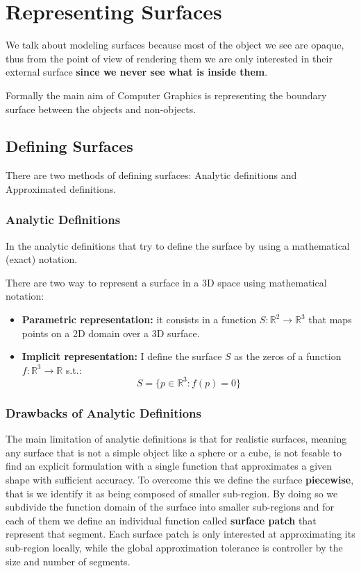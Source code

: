 \chapter{Representing Surfaces}
We talk about modeling surfaces because most of the object we see are opaque, thus from the point of view of rendering them we are only interested in their external surface \textbf{since we never see what is inside them}.\par
Formally the main aim of Computer Graphics is representing the boundary surface between the objects and non-objects.

\section{Defining Surfaces}
There are two methods of defining surfaces: Analytic definitions and Approximated definitions.

\subsection{Analytic Definitions}
In the analytic definitions that try to define the surface by using a mathematical (exact) notation.\par
There are two way to represent a surface in a 3D space using mathematical notation:
\begin{itemize}
    \item \textbf{Parametric representation:} it consists in a function $S : \mathbb{R}^{2} \rightarrow \mathbb{R}^{3}$ that maps points on a 2D domain over a 3D surface.  
    \item \textbf{Implicit representation:} I define the surface $S$ as the zeros of a function $f: \mathbb{R}^{3} \rightarrow \mathbb{R}$ s.t.:
        \begin{equation*}
            S = \{p \in \mathbb{R}^{3}: f(p) = 0\}
        \end{equation*}
\end{itemize}

\subsection{Drawbacks of Analytic Definitions}
The main limitation of analytic definitions is that for realistic surfaces, meaning any surface that is not a simple object like a sphere or a cube, is not fesable to find an explicit formulation with a single function that approximates a given shape with sufficient accuracy. To overcome this we define the surface \textbf{piecewise}, that is we identify it as being composed of smaller sub-region. By doing so we subdivide the function domain of the surface into smaller sub-regions and for each of them we define an individual function called \textbf{surface patch} that represent that segment. Each surface patch is only interested at approximating its sub-region locally, while the global approximation tolerance is controller by the size and number of segments.

